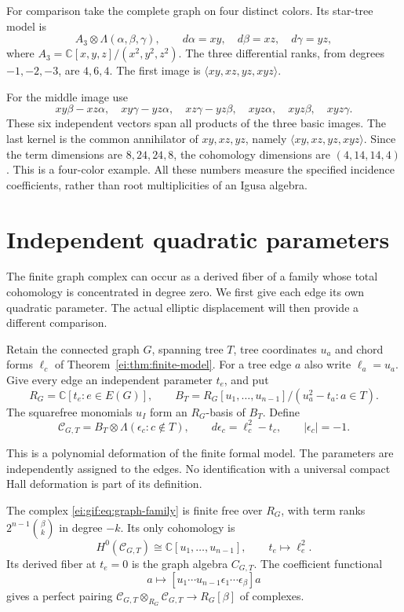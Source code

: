 For comparison take the complete graph on four
distinct colors. Its star-tree model is
\[
 A_3\otimes\Lambda(\alpha,\beta,\gamma),\qquad
 d\alpha=xy,\quad d\beta=xz,\quad d\gamma=yz,
\]
where $A_3=\mathbb C[x,y,z]/(x^2,y^2,z^2)$.
The three differential ranks, from degrees $-1,-2,-3$,
are $4,6,4$. The first image is
$\langle xy,xz,yz,xyz\rangle$.

For the middle image use
\[
 xy\beta-xz\alpha,\quad xy\gamma-yz\alpha,
 \quad xz\gamma-yz\beta,
 \quad xyz\alpha,\quad xyz\beta,\quad xyz\gamma.
\]
These six independent vectors span all products of
the three basic images. 
The last kernel is the
common annihilator of $xy,xz,yz$, namely
$\langle xy,xz,yz,xyz\rangle$.
Since the term dimensions are $8,24,24,8$, the
cohomology dimensions are $(4,14,14,4)$.
This is a four-color example. All these numbers
measure the specified incidence coefficients,
rather than root multiplicities of an Igusa algebra.

\section{Independent quadratic parameters}
\label{ei:sec:independent}

The finite graph complex can occur as a derived fiber of a family
whose total cohomology is concentrated in degree zero. We first give
each edge its own quadratic parameter. The actual elliptic
displacement will then provide a different comparison.


Retain the connected graph $G$, spanning tree $T$,
tree coordinates $u_a$ and chord forms $\ell_c$ of
Theorem~\ref{ei:thm:finite-model}.
For a tree edge $a$ also write $\ell_a=u_a$.
Give every edge an independent parameter $t_e$, and put
\[
 R_G=\mathbb C[t_e:e\in E(G)],\qquad
 B_T=R_G[u_1,\ldots,u_{n-1}]/(u_a^2-t_a:a\in T).
\]
The squarefree monomials $u_I$ form an $R_G$-basis of
$B_T$. Define
\begin{equation}\label{ei:gif:eq:graph-family}
 \mathcal C_{G,T}=B_T\otimes\Lambda(\epsilon_c:c\notin T),
 \qquad d\epsilon_c=\ell_c^2-t_c,
 \qquad |\epsilon_c|=-1.
\end{equation}

This is a polynomial deformation of the finite formal
model. The parameters are independently assigned to
the edges. No identification with a universal compact
Hall deformation is part of its definition.

\begin{theorem}\label{ei:gif:thm:graph-family}
The complex \eqref{ei:gif:eq:graph-family} is finite free
over $R_G$, with term ranks
$2^{n-1}\binom{\beta}{k}$ in degree $-k$.
Its only cohomology is
\begin{equation}\label{ei:gif:eq:family-cohomology}
 H^0(\mathcal C_{G,T})\cong
 \mathbb C[u_1,\ldots,u_{n-1}],\qquad
 t_e\longmapsto\ell_e^2.
\end{equation}
Its derived fiber at $t_e=0$ is the graph algebra
$C_{G,T}$. The coefficient functional
\[
 a\longmapsto
 [u_1\cdots u_{n-1}\epsilon_1\cdots\epsilon_\beta]a
\]
gives a perfect pairing
$\mathcal C_{G,T}\otimes_{R_G}\mathcal C_{G,T}
\to R_G[\beta]$ of complexes.
\end{theorem}

